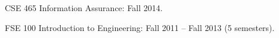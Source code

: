 


\begin{rExperience}

  \item CSE 465 Information Assurance: Fall 2014.

  \item FSE 100 Introduction to Engineering: Fall 2011 -- Fall 2013 (5 semesters).

\end{rExperience}
